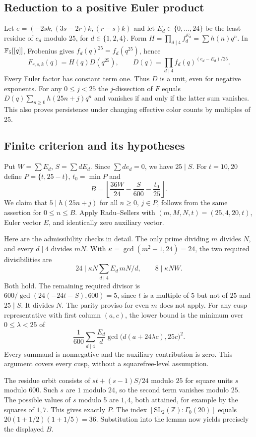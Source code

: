 \documentclass[11pt,a4paper]{article}
\begin{document}
\subsection{Reduction to a positive Euler product}
Let $e=(-2sk,(3s-2r)k,(r-s)k)$ and let $E_d\in\{0,\ldots,24\}$ be the least residue of $e_d$ modulo $25$, for $d\in\{1,2,4\}$. Form $H=\prod_{d\mid4}f_d^{E_d}=\sum h(n)q^n$. In $\mathbb F_5[[q]]$, Frobenius gives $f_d(q)^{25}=f_d(q^{25})$, hence
\[
 F_{r,s,k}(q)=H(q)D(q^{25}),\qquad
 D(q)=\prod_{d\mid4} f_d(q)^{(e_d-E_d)/25}.
\]
Every Euler factor has constant term one. Thus $D$ is a unit, even for negative exponents. For any $0\le j<25$ the $j$-dissection of $F$ equals $D(q)\sum_{n\ge0}h(25n+j)q^n$ and vanishes if and only if the latter sum vanishes. This also proves persistence under changing effective color counts by multiples of 25.

\subsection{Finite criterion and its hypotheses}
Put $W=\sum E_d$, $S=\sum dE_d$. Since $\sum d e_d=0$, we have $25\mid S$. For $t=10,20$ define $P=\{t,25-t\}$, $t_0=\min P$ and
\[
 B=\left\lfloor\frac{36W}{24}-\frac{S}{600}-\frac{t_0}{25}\right\rfloor .
\]
We claim that $5\mid h(25n+j)$ for all $n\ge0$, $j\in P$, follows from the same assertion for $0\le n\le B$. Apply Radu--Sellers \cite[Lemma 2.4]{R21H:RS} with $(m,M,N,t)=(25,4,20,t)$, Euler vector $E$, and identically zero auxiliary vector.

Here are the admissibility checks in detail. The only prime dividing $m$ divides $N$, and every $d\mid4$ divides $mN$. With $\kappa=\gcd(m^2-1,24)=24$, the two required divisibilities are
\[
24\mid\kappa N\sum_{d\mid4}E_d\,mN/d,
\qquad 8\mid\kappa N W .
\]
Both hold. The remaining required divisor is
$600/\gcd(24(-24t-S),600)=5$, since $t$ is a multiple of $5$ but not of $25$ and $25\mid S$. It divides $N$. The parity proviso for even $m$ does not apply. For any cusp representative with first column $(a,c)$, the lower bound is the minimum over $0\le\lambda<25$ of
\[
 \frac1{600}\sum_{d\mid4}\frac{E_d}{d}\gcd\big(d(a+24\lambda c),25c\big)^2 .
\]
Every summand is nonnegative and the auxiliary contribution is zero. This argument covers every cusp, without a squarefree-level assumption.

The residue orbit consists of $st+(s-1)S/24$ modulo $25$ for square units $s$ modulo $600$. Such $s$ are $1$ modulo $24$, so the second term vanishes modulo $25$. The possible values of $s$ modulo 5 are $1,4$, both attained, for example by the squares of $1,7$. This gives exactly $P$. The index $[\mathrm{SL}_2(\mathbb Z):\Gamma_0(20)]$ equals $20(1+1/2)(1+1/5)=36$. Substitution into the lemma now yields precisely the displayed $B$.
\end{document}
